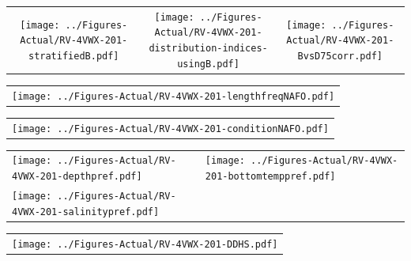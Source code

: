 \documentclass[12pt]{article}\usepackage[]{graphicx}\usepackage[]{color}
\begin{document}
\vspace{1cm}
\begin{minipage}{1.0\textwidth}
 \begin{tabular}{ccc}
\texttt{[image: ../Figures-Actual/RV-4VWX-201-stratifiedB.pdf]} & 
\texttt{[image: ../Figures-Actual/RV-4VWX-201-distribution-indices-usingB.pdf]} & 
\texttt{[image: ../Figures-Actual/RV-4VWX-201-BvsD75corr.pdf]} \\ 
\end{tabular} 
\end{minipage}
\clearpage
\begin{minipage}{1.0\textwidth}
 \begin{tabular}{c}
\texttt{[image: ../Figures-Actual/RV-4VWX-201-lengthfreqNAFO.pdf]} \\ 
\end{tabular} 
\end{minipage}
\newline

\vspace{1cm}
\begin{minipage}{1.0\textwidth}
 \begin{tabular}{c}
\texttt{[image: ../Figures-Actual/RV-4VWX-201-conditionNAFO.pdf]} \\ 
\end{tabular} 
\end{minipage}
\clearpage
\begin{minipage}{1.0\textwidth}
 \begin{tabular}[t]{m{3in}m{3in}}
\texttt{[image: ../Figures-Actual/RV-4VWX-201-depthpref.pdf]} & 
\texttt{[image: ../Figures-Actual/RV-4VWX-201-bottomtemppref.pdf]} \\ 
\texttt{[image: ../Figures-Actual/RV-4VWX-201-salinitypref.pdf]} & 
 \\ 
\end{tabular} 
\end{minipage}
\newline

\vspace{1cm}
\begin{minipage}{1.0\textwidth}
 \begin{tabular}{c}
\texttt{[image: ../Figures-Actual/RV-4VWX-201-DDHS.pdf]} \\ 
\end{tabular} 
\end{minipage}
\clearpage
\end{document}
